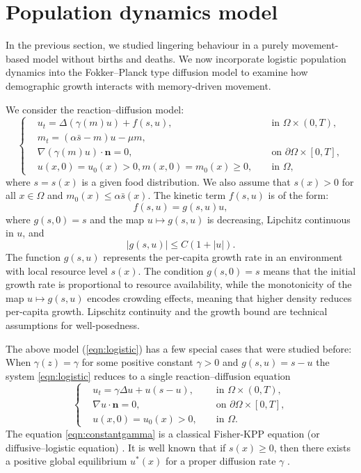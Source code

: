 \documentclass{article}
\begin{document}
\section{Population dynamics model}\label{sec:population dynamics}
In the previous section, we studied lingering behaviour in a purely movement-based model without births and deaths. We now incorporate logistic population dynamics into the Fokker--Planck type diffusion model to examine how demographic growth interacts with memory-driven movement.

We consider the reaction--diffusion model:
\begin{equation}\label{eqn:logistic}
\left\{\begin{aligned}
    &u_t = \Delta (\gamma(m)u) + f(s,u),  && \text{ in }\Omega \times (0,T),\\
    &m_t = (\alpha \bar s -  m) u-\mu m,\\
    &\nabla (\gamma(m)u) \cdot \textbf{n}=0, && \text{ on }\partial \Omega\times [0,T],\\
    &u(x,0) = u_0(x)>0, m(x,0) = m_0(x)\ge 0, &&\text{ in } \Omega,
\end{aligned}\right.
\end{equation} where $s=s(x)$ is a given food distribution. We also assume that $s(x)>0$ for all $x\in \Omega$ and $m_0(x) \le \alpha \bar s(x)$. The kinetic term $f(s,u)$ is of the form:
\begin{equation*}
    f(s,u) = g(s,u)u,
\end{equation*} where $g(s,0)= s$ and the map $u\mapsto g(s,u)$ is decreasing, Lipchitz continuous in $u$, and 
\[ |g(s,u)|\le C(1+|u|). \]
The function $g(s,u)$ represents the per-capita growth rate in an environment with local resource level $s(x)$. The condition $g(s,0)=s$ means that the initial growth rate is proportional to resource availability, while the monotonicity of the map $u\mapsto g(s,u)$ encodes crowding effects, meaning that higher density reduces per-capita growth. Lipschitz continuity and the growth bound are technical assumptions for well-posedness.

The above model (\ref{eqn:logistic}) has a few special cases that were studied before: \\

    When $\gamma(z)=\gamma$ for some positive constant $\gamma>0$ and $g(s,u)=s-u$ the system \eqref{eqn:logistic} reduces to a single reaction--diffusion equation
    \begin{equation}\label{eqn:constantgamma}
\left\{\begin{aligned}
    &u_t = \gamma\Delta u + u(s-u),  && \text{ in }\Omega \times (0,T),\\
    &\nabla u \cdot \textbf{n}=0, && \text{ on }\partial \Omega\times [0,T],\\
    &u(x,0) = u_0(x)>0, &&\text{ in } \Omega.
\end{aligned}\right.
\end{equation} The equation \eqref{eqn:constantgamma} is a classical Fisher-KPP equation (or diffusive--logistic equation) \cite{Murray2002}. It is well known that if $s(x)\ge 0$, then there exists a positive global equilibrium $u^*(x)$ for a proper diffusion rate $\gamma$ \cite{Cantrell1989,Lou2006}.
\end{document}
